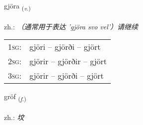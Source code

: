 \documentclass[frontgrid, backgrid]{flacards}\usepackage[]{graphicx}\usepackage[]{xcolor}
\begin{document}
\renewcommand{\flhead}{\vskip5pt \fboxsep=0pt {\small\bfseries\footnotesize Sagnorð | 动词}}
\renewcommand{\fcfoot}{\vskip5pt \fboxsep=0pt \hspace{2pt}{\small\bfseries\footnotesize 3K}}

\renewcommand{\blhead}{\vskip5pt {\small\bfseries\footnotesize Sagnorð | 动词 }}
\renewcommand{\bcfoot}{\vskip5pt \hspace{2pt}{\small\bfseries\footnotesize 3K}}


{gjöra \small{\textsubscript{(\textit{v.})}} \\[1ex] %
\textphonetic{[cœːra]} \\
zh.: \emph{（通常用于表达 'gjöra svo vel'）请继续} \\  [2ex]
\renewcommand*{\arraystretch}{0.8}
\begin{tabular}{p{1cm}l}
\textsc{1sg}: & gjöri -- gjörði -- gjört \\ 
\textsc{2sg}: & gjörir -- gjörðir -- gjört \\ 
\textsc{3sg}: & gjörir -- gjörði -- gjört \\ 
\end{tabular}
}

\renewcommand{\flhead}{\vskip5pt \fboxsep=0pt {\small\bfseries\footnotesize Nafnorð | 名词}}
\renewcommand{\fcfoot}{\vskip5pt \fboxsep=0pt \hspace{2pt}{\small\bfseries\footnotesize 3K}}

\renewcommand{\blhead}{\vskip5pt {\small\bfseries\footnotesize Nafnorð | 名词 }}
\renewcommand{\bcfoot}{\vskip5pt \hspace{2pt}{\small\bfseries\footnotesize 3K}}


{gröf \small{\textsubscript{(\textit{f.})}} \\[1ex] %
\textphonetic{[krœːf]} \\
zh.: \emph{坟} \\  [2ex]
\renewcommand*{\arraystretch}{0.8}
}
\end{document}
